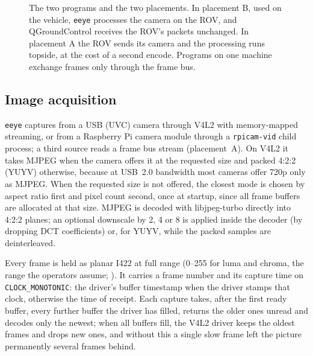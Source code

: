\documentclass[a4paper,fleqn]{cas-sc}
\newcommand{\eeye}{\texttt{eeye}}
\begin{document}
\begin{figure}[pos=htbp]
  \caption{The two programs and the two placements. In placement B, used on the
    vehicle, \eeye{} processes the camera on the ROV, and QGroundControl receives the
    ROV's packets unchanged. In placement A the ROV sends its camera and the
    processing runs topside, at the cost of a second encode. Programs on one machine
    exchange frames only through the frame bus.}\label{fig:overview}
\end{figure}

\subsection{Image acquisition}\label{sec:capture}

\eeye{} captures from a USB (UVC) camera through V4L2 \citep{v4l2} with memory-mapped
streaming, or from a Raspberry Pi camera module through a \texttt{rpicam-vid}
\citep{rpicamapps} child process; a third source reads a frame bus stream
(placement~A). On V4L2 it takes MJPEG when the camera offers it at the requested size
and packed 4:2:2 (YUYV) otherwise, because at USB~2.0 bandwidth most cameras offer
720p only as MJPEG. When the requested size is not offered, the closest mode is chosen
by aspect ratio first and pixel count second, once at startup, since all frame buffers
are allocated at that size. MJPEG is decoded with libjpeg-turbo \citep{libjpegturbo}
directly into 4:2:2 planes; an optional downscale by 2, 4 or 8 is applied inside the
decoder (by dropping DCT coefficients) or, for YUYV, while the packed samples are
deinterleaved.

Every frame is held as planar I422 at full range (0--255 for luma and chroma, the range
the operators assume; \citealp{itu_bt601}). It carries a frame number and its capture
time on \texttt{CLOCK\_MONOTONIC}: the driver's buffer timestamp when the driver
stamps that clock, otherwise the time of receipt. Each capture takes, after the first
ready buffer, every further buffer the driver has filled, returns the older ones
unread and decodes only the newest; when all buffers fill, the V4L2 driver keeps the
oldest frames and drops new ones, and without this a single slow frame left the
picture permanently several frames behind.
\end{document}

